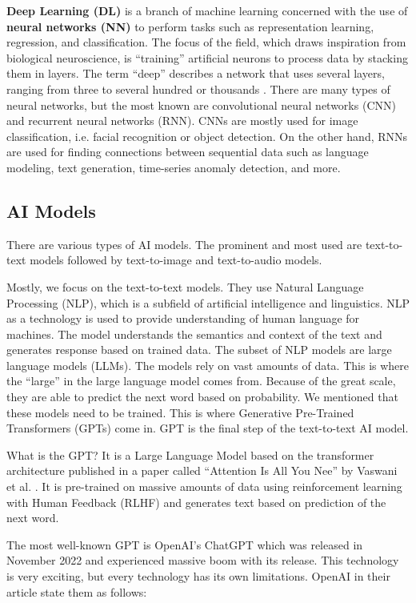 \textbf{Deep Learning (DL)} is a branch of machine learning concerned with the use of \textbf{neural networks (NN)} to perform tasks such as representation learning, regression, and classification. The focus of the field, which draws inspiration from biological neuroscience, is ``training'' artificial neurons to process data by stacking them in layers. The term ``deep'' describes a network that uses several layers, ranging from three to several hundred or thousands \cite{LeCun2015}. There are many types of neural networks, but the most known are convolutional neural networks (CNN) and recurrent neural networks (RNN). CNNs are mostly used for image classification, i.e. facial recognition or object detection. On the other hand, RNNs are used for finding connections between sequential data such as language modeling, text generation, time-series anomaly detection, and more.


\subsection{AI Models \label{subsec:AI-Models}}

There are various types of AI models. The prominent and most used are text-to-text models followed by text-to-image and text-to-audio models. 

Mostly, we focus on the text-to-text models. They use Natural Language Processing (NLP), which is a subfield of artificial intelligence and linguistics. NLP as a technology is used to provide understanding of human language for machines. The model understands the semantics and context of the text and generates response based on trained data. The subset of NLP models are large language models (LLMs). The models rely on vast amounts of data. This is where the ``large'' in the large language model comes from. Because of the great scale, they are able to predict the next word based on probability. We mentioned that these models need to be trained. This is where Generative Pre-Trained Transformers (GPTs) come in. GPT is the final step of the text-to-text AI model. 

What is the GPT? It is a Large Language Model based on the transformer architecture published in a paper called ``Attention Is All You Nee'' by Vaswani et al. \cite{vaswani2023attentionneed}. It is pre-trained on massive amounts of data using reinforcement learning with Human Feedback (RLHF) \cite{openai_chatgpt_page} and generates text based on prediction of the next word.

The most well-known GPT is OpenAI's ChatGPT which was released in November 2022 and experienced massive boom with its release. This technology is very exciting, but every technology has its own limitations. OpenAI in their article \cite{openai_chatgpt_page} state them as follows:

